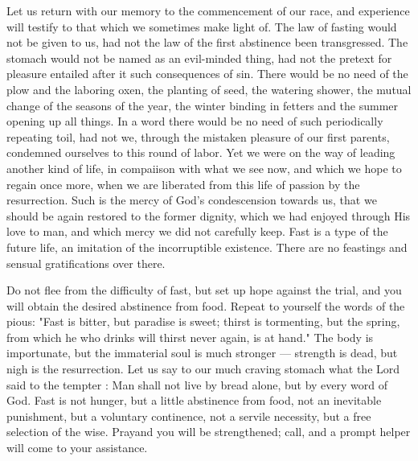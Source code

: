 Let us return with our memory to the commencement
of our race, and experience will 
testify to that which we sometimes make light 
of. The law of fasting would not be given to 
us, had not the law of the first abstinence been 
transgressed. The stomach would not be 
named as an evil-minded thing, had not the 
pretext for pleasure entailed after it such consequences
of sin. There would be no need of 
the plow and the laboring oxen, the planting of 
seed, the watering shower, the mutual change of 
the seasons of the year, the winter binding in 
fetters and the summer opening up all things. 
In a word there would be no need of such 
periodically repeating toil, had not we, through 
the mistaken pleasure of our first parents, condemned
ourselves to this round of labor. Yet 
we were on the way of leading another kind 
of life, in compaiison with what we see now, 
and which we hope to regain once more, when 
we are liberated from this life of passion by 
the resurrection. Such is the mercy of God's 
condescension towards us, that we should be
again restored to the former dignity, which we 
had enjoyed through His love to man, and 
which mercy we did not carefully keep. Fast 
is a type of the future life, an imitation of the 
incorruptible existence. There are no feastings
and sensual gratifications over there. 

Do not flee from the difficulty of fast, but set 
up hope against the trial, and you will obtain 
the desired abstinence from food. Repeat to 
yourself the words of the pious: "Fast is 
bitter, but paradise is sweet; thirst is tormenting,
but the spring, from which he who drinks 
will thirst never again, is at hand." The body 
is importunate, but the immaterial soul is 
much stronger — strength is dead, but nigh is 
the resurrection. Let us say to our much craving
stomach what the Lord said to the tempter : 
Man shall not live by bread alone, but by every 
word of God. Fast is not hunger, but a little 
abstinence from food, not an inevitable punishment,
but a voluntary continence, not a servile 
necessity, but a free selection of the wise. 
Prayand you will be strengthened; call, and a 
prompt helper will come to your assistance.
